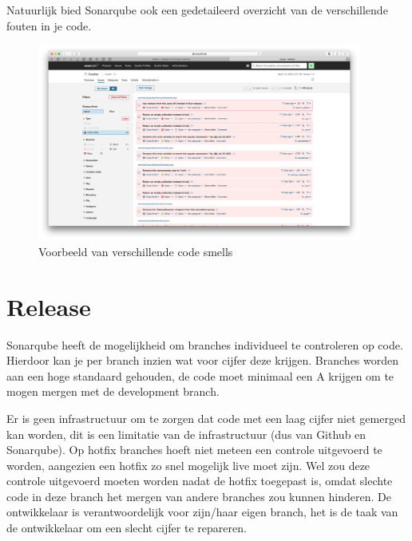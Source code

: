 Natuurlijk bied Sonarqube ook een gedetaileerd overzicht van de verschillende fouten in je code.
\begin{figure}[H]
	\centering
	\centering\includegraphics[width=0.95\textwidth]{images/Codacy}
	\caption{Voorbeeld van verschillende code smells}
\end{figure}

\section{Release}
Sonarqube heeft de mogelijkheid om branches individueel te controleren op code.
Hierdoor kan je per branch inzien wat voor cijfer deze krijgen.
Branches worden aan een hoge standaard gehouden, de code moet minimaal een A krijgen om te mogen mergen met de development branch.

Er is geen infrastructuur om te zorgen dat code met een laag cijfer niet gemerged kan worden, dit is een limitatie van de infrastructuur (dus van Github en Sonarqube).
Op hotfix branches hoeft niet meteen een controle uitgevoerd te worden, aangezien een hotfix zo snel mogelijk live moet zijn.
Wel zou deze controle uitgevoerd moeten worden nadat de hotfix toegepast is, omdat slechte code in deze branch het mergen van andere branches zou kunnen hinderen.
De ontwikkelaar is verantwoordelijk voor zijn/haar eigen branch, het is de taak van de ontwikkelaar om een slecht cijfer te repareren.
